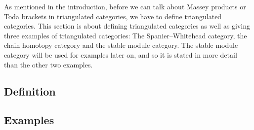 As mentioned in the introduction, before we can talk about Massey products or Toda brackets in triangulated categories, we have to define triangulated categories. This section is about defining triangulated categories as well as giving three examples of triangulated categories: The Spanier--Whitehead category, the chain homotopy category and the stable module category. The stable module category will be used for examples later on, and so it is stated in more detail than the other two examples.

\subsection{Definition}


\subsection{Examples}
